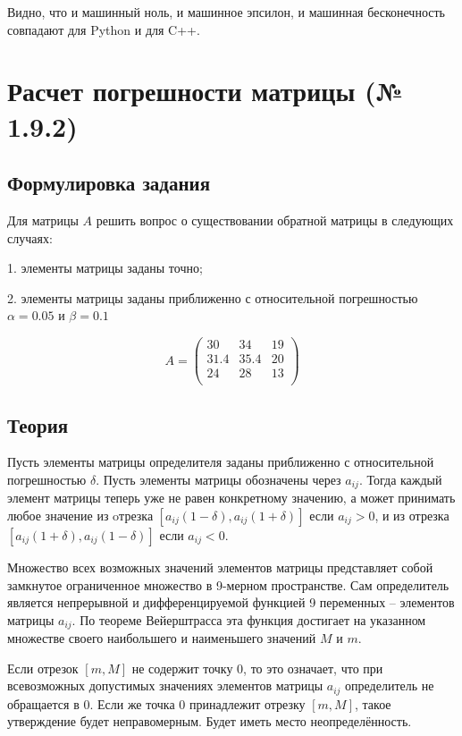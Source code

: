 \documentclass[a4paper,11pt]{article}
\theoremstyle{definition} %
\theoremstyle{remark} %
\begin{document}
Видно, что и машинный ноль, и машинное эпсилон, и машинная бесконечность совпадают для Python и для C++.

\newpage
\section{Расчет погрешности матрицы (№ 1.9.2)}

\subsection{Формулировка задания}

Для матрицы $A$ решить вопрос о существовании обратной матрицы в следующих случаях:

1. элементы матрицы заданы точно;

2. элементы матрицы заданы приближенно с относительной погрешностью $\alpha = 0.05$ и $\beta = 0.1$

$$
A =
\begin{pmatrix}
    30 & 34 & 19 \\
    31.4 & 35.4 & 20 \\
    24 & 28 & 13 \\
\end{pmatrix}
$$

\subsection{Теория}

Пусть элементы матрицы определителя заданы приближенно с относительной погрешностью $\delta$. 
Пусть элементы матрицы обозначены через $a_{ij}$.
Тогда каждый элемент матрицы теперь уже не равен конкретному значению, а может принимать любое значение из oтрезка
$[a_{ij} (1 - \delta), a_{ij} (1 + \delta )]$ если $a_{ij} > 0$,
и из отрезка $[a_{ij} (1 + \delta), a_{ij} (1 - \delta )]$ если $a_{ij} < 0$.

Множество всех возможных значений элементов матрицы представляет собой замкнутое ограниченное множество в 9-мерном пространстве. 
Сам определитель является непрерывной и дифференцируемой функцией 9 переменных -- элементов матрицы $a_{ij}$.
По теореме Вейерштрасса эта функция достигает на указанном множестве своего наибольшего и наименьшего значений $M$ и $m$.

Если отрезок $[m, M]$ не содержит точку 0, то это означает, что при всевозможных допустимых значениях элементов матрицы $a_{ij}$
определитель не обращается в 0. 
Если же точка 0 принадлежит отрезку $[m, M]$, такое утверждение будет неправомерным. Будет иметь место неопределённость.
\end{document}
